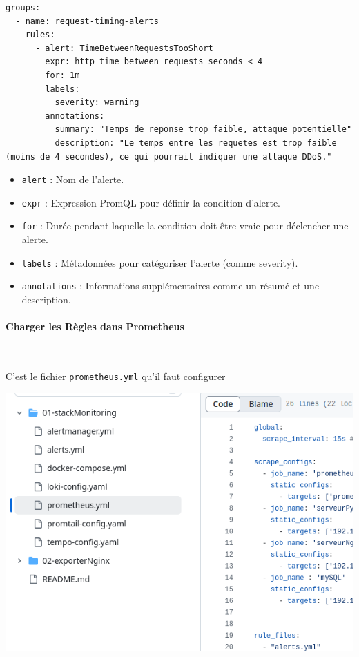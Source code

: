 \documentclass[french, 12pt]{article}%
\newcommand{\itemE}{\item[$\bullet$]}
\begin{document}
\begin{lstlisting}[style=commande]  
groups:
  - name: request-timing-alerts
    rules:
      - alert: TimeBetweenRequestsTooShort
        expr: http_time_between_requests_seconds < 4
        for: 1m
        labels:
          severity: warning
        annotations:
          summary: "Temps de reponse trop faible, attaque potentielle"
          description: "Le temps entre les requetes est trop faible (moins de 4 secondes), ce qui pourrait indiquer une attaque DDoS."
\end{lstlisting}


\begin{itemize}
\itemE \verb?alert? : Nom de l'alerte.
\itemE \verb?expr? : Expression PromQL pour définir la condition d'alerte.
\itemE \verb?for? : Durée pendant laquelle la condition doit être vraie pour déclencher une alerte.
\itemE \verb?labels? : Métadonnées pour catégoriser l'alerte (comme severity).
\itemE \verb?annotations? : Informations supplémentaires comme un résumé et une description.
\end{itemize}

\paragraph{Charger les Règles dans Prometheus} \ 

C'est le fichier \verb?prometheus.yml? qu'il faut configurer

\begin{center}
\includegraphics[scale=0.4]{./ressource/depot_prometheus_yml}
\end{center}
\end{document}
